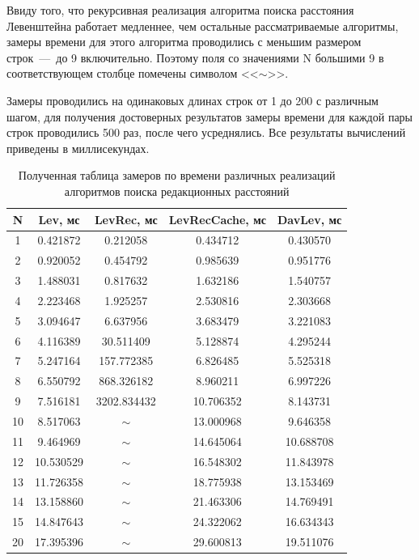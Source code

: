 Ввиду того, что рекурсивная реализация алгоритма поиска расстояния Левенштейна работает медленнее, чем остальные рассматриваемые алгоритмы, замеры времени для этого алгоритма проводились с меньшим размером строк~---~до 9 включительно. Поэтому поля со значениями N большими 9 в соответствующем столбце помечены символом <<$\sim$>>. 

Замеры проводились на одинаковых длинах строк от 1 до 200 с различным шагом, для получения достоверных результатов замеры времени для каждой пары строк проводились 500 раз, после чего усреднялись. Все результаты вычислений приведены в миллисекундах.

\begin{table}[!ht]
	\centering
	\caption{Полученная таблица замеров по времени различных реализаций алгоритмов поиска редакционных расстояний}
	\begin{tabular}{|c|c|c|c|c|}
		\hline
		N  & Lev, мс & LevRec, мс & LevRecCache, мс & DavLev, мс \\
		\hline
		1 & 0.421872 & 0.212058 & 0.434712 & 0.430570 \\ \hline
		2 & 0.920052 & 0.454792 & 0.985639 & 0.951776 \\ \hline
		3 & 1.488031 & 0.817632 & 1.632186 & 1.540757 \\ \hline
		4 & 2.223468 & 1.925257 & 2.530816 & 2.303668 \\ \hline
		5 & 3.094647 & 6.637956 & 3.683479 & 3.221083 \\ \hline
		6 & 4.116389 & 30.511409 & 5.128874 & 4.295244 \\ \hline
		7 & 5.247164 & 157.772385 & 6.826485 & 5.525318 \\ \hline
		8 & 6.550792 & 868.326182 & 8.960211 & 6.997226 \\ \hline
		9 & 7.516181 & 3202.834432 & 10.706352 & 8.143731 \\ \hline
		10 & 8.517063 & $\sim$ & 13.000968 & 9.646358 \\ \hline
		11 & 9.464969 & $\sim$ & 14.645064 & 10.688708 \\ \hline
		12 & 10.530529 & $\sim$ & 16.548302 & 11.843978 \\ \hline
		13 & 11.726358 & $\sim$ & 18.775938 & 13.153469 \\ \hline
		14 & 13.158860 & $\sim$ & 21.463306 & 14.769491 \\ \hline
		15 & 14.847643 & $\sim$ & 24.322062 & 16.634343 \\ \hline
		20 & 17.395396 & $\sim$ & 29.600813 & 19.511076 \\ \hline

\end{tabular}
\end{table}
